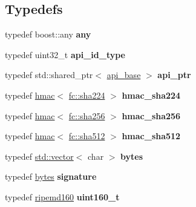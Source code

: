 \subsection*{Typedefs}
\begin{DoxyCompactItemize}
\item 
\mbox{\label{namespacefc_a8b03fb95276f683bde05b7715d9f0014}} 
typedef boost\+::any {\bfseries any}
\item 
\mbox{\label{namespacefc_a18e9e0bd9c0a52896425ae1172bc4e2b}} 
typedef uint32\+\_\+t {\bfseries api\+\_\+id\+\_\+type}
\item 
\mbox{\label{namespacefc_abc7fa69d18531d7645307d15b3102886}} 
typedef std\+::shared\+\_\+ptr$<$ \mbox{\hyperlink{classfc_1_1api__base}{api\+\_\+base}} $>$ {\bfseries api\+\_\+ptr}
\item 
\mbox{\label{namespacefc_a9613d15e9a53e421a260a92769c1acfb}} 
typedef \mbox{\hyperlink{classfc_1_1hmac}{hmac}}$<$ \mbox{\hyperlink{classfc_1_1sha224}{fc\+::sha224}} $>$ {\bfseries hmac\+\_\+sha224}
\item 
\mbox{\label{namespacefc_a9b621124067e1f4c8f3dcdce8afa150d}} 
typedef \mbox{\hyperlink{classfc_1_1hmac}{hmac}}$<$ \mbox{\hyperlink{classfc_1_1sha256}{fc\+::sha256}} $>$ {\bfseries hmac\+\_\+sha256}
\item 
\mbox{\label{namespacefc_a4faeb3fdc0252035fbd10ea94b230f35}} 
typedef \mbox{\hyperlink{classfc_1_1hmac}{hmac}}$<$ \mbox{\hyperlink{classfc_1_1sha512}{fc\+::sha512}} $>$ {\bfseries hmac\+\_\+sha512}
\item 
\mbox{\label{namespacefc_a152f420899b37579401bbdb7229a46d3}} 
typedef \mbox{\hyperlink{classstd_1_1vector}{std\+::vector}}$<$ char $>$ {\bfseries bytes}
\item 
\mbox{\label{namespacefc_a50190ee8a24af6929033b058b16158c4}} 
typedef \mbox{\hyperlink{classstd_1_1vector}{bytes}} {\bfseries signature}
\item 
\mbox{\label{namespacefc_a5d143859f1f34b560f2f2f13d9d078d4}} 
typedef \mbox{\hyperlink{classfc_1_1ripemd160}{ripemd160}} {\bfseries uint160\+\_\+t}

\end{DoxyCompactItemize}
